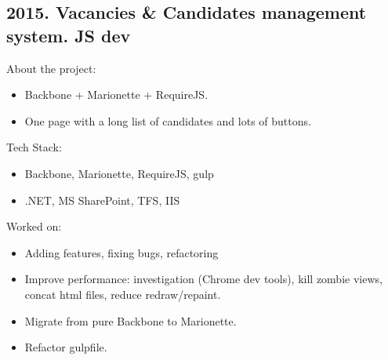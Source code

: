 \documentclass[a4paper, 14pt]{article}
\begin{document}
  \subsection{2015. Vacancies \& Candidates management system. JS dev}
    About the project:
    \begin{itemize}
      \item Backbone + Marionette + RequireJS. \\
      \item One page with a long list of candidates and lots of buttons. \\
    \end{itemize}
    Tech Stack:
    \begin{itemize}
      \item Backbone, Marionette, RequireJS, gulp \\
      \item .NET, MS SharePoint, TFS, IIS \\
    \end{itemize}
    Worked on: 
    \begin{itemize}
      \item Adding features, fixing bugs, refactoring \\
      \item Improve performance: investigation (Chrome dev tools), kill zombie views, concat html files, reduce redraw/repaint.  \\
      \item Migrate from pure Backbone to Marionette. \\
      \item Refactor gulpfile. \\
    \end{itemize}
\end{document}
